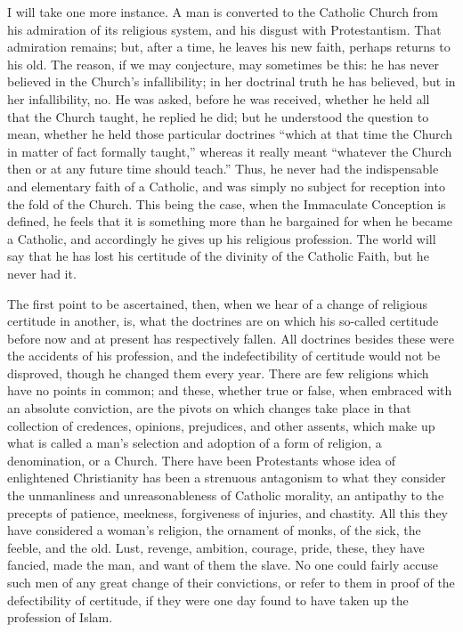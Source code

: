 I will take one more instance. A man is converted to the Catholic
Church from his admiration of its religious system, and his disgust
with Protestantism. That admiration remains; but, after a time, he
leaves his new faith, perhaps returns to his old. The reason, if we
may conjecture, may sometimes be this: he has never believed in the
Church's infallibility; in her doctrinal truth he has believed, but in
her infallibility, no. He was asked, before he was received, whether
he held all that the Church taught, he replied he did; but he
understood the question to mean, whether he held those particular
doctrines ``which at that time the Church in matter of fact
formally taught,'' whereas it really meant ``whatever the
Church then or at any future time should teach.'' Thus, he
never had the indispensable and elementary faith of a Catholic, and
was simply no subject for reception into the fold of the Church. This
being the case, when the Immaculate Conception is defined, he feels
that it is something more than he bargained for when he became a
Catholic, and accordingly he gives up his religious profession. The
world will say that he has lost his certitude of the divinity of the
Catholic Faith, but he never had it.

The first point to be ascertained, then, when we hear of a change
of religious certitude in another, is, what the doctrines are on which
his so-called certitude before now and at present has respectively
fallen. All doctrines besides these were the accidents of his
profession, and the indefectibility of certitude would not be
disproved, though he changed them every year. There are few religions
which have no points in common; and these, whether true or false, when
embraced with an absolute conviction, are the pivots on which changes
take place in that collection of credences, opinions, prejudices, and
other assents, which make up what is called a man's selection and
adoption of a form of religion, a denomination, or a Church. There
have been Protestants whose idea of enlightened Christianity has been
a strenuous antagonism to what they consider the unmanliness and
unreasonableness of Catholic morality, an antipathy to the precepts of
patience, meekness, forgiveness of injuries, and chastity. All this
they have considered a woman's religion, the ornament of monks, of the
sick, the feeble, and the old. Lust, revenge, ambition, courage,
pride, these, they have fancied, made the man, and want of them
the slave. No one could fairly accuse such men of any great change of
their convictions, or refer to them in proof of the defectibility of
certitude, if they were one day found to have taken up the profession
of Islam.

